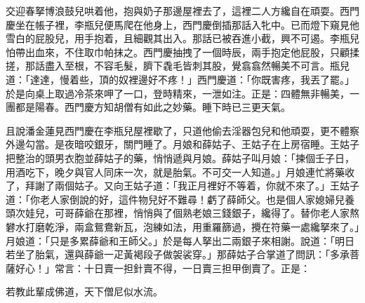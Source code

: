 交迎春拏博浪鼓兒哄着他，抱與奶子那邊屋裡去了，這裡二人方纔自在頑耍。西門慶坐在帳子裡，李瓶兒便馬爬在他身上，西門慶倒插那話入牝中。已而燈下窺見他雪白的屁股兒，用手抱着，且細觀其出入。那話已被吞進小截，興不可遏。李瓶兒怕帶出血來，{}不住取巾帕抹之。西門慶抽拽了一個時辰，兩手抱定他屁股，只顧揉搓，那話盡入至根，不容毛髮，臍下毳毛皆刺其股，覺翕翕然暢美不可言。瓶兒道：「達達，慢着些，頂的奴裡邊好不疼！」西門慶道：「你既害疼，我丟了罷。」於是向桌上取過冷茶來呷了一口，登時精來，一泄如注。正是：四體無非暢美，一團都是陽春。西門慶方知胡僧有如此之妙藥。睡下時已三更天氣。

且說潘金蓮見西門慶在李瓶兒屋裡歇了，只道他偷去淫器包兒和他頑耍，更不體察外邊勾當。是夜暗咬銀牙，關門睡了。月娘和薛姑子、王姑子在上房宿睡。王姑子把整治的頭男衣胞並薛姑子的藥，悄悄遞與月娘。薛姑子叫月娘：「揀個壬子日，用酒吃下，晚夕與官人同床一次，就是胎氣。不可交一人知道。」月娘連忙將藥收了，拜謝了兩個姑子。又向王姑子道：「我正月裡好不等着，你就不來了。」王姑子道：「你老人家倒說的好，這件物兒好不難尋！虧了薛師父。也是個人家媳婦兒養頭次娃兒，可哥薛爺在那裡，悄悄與了個熟老娘三錢銀子，纔得了。{}替你老人家熬礬水打磨乾淨，兩盒鴛鴦新瓦，泡練如法，用重羅篩過，攪在符藥一處纔拏來了。」月娘道：「只是多累薛爺和王師父。」於是每人拏出二兩銀子來相謝。說道：「明日若坐了胎氣，還與薛爺一疋黃褐段子做袈裟穿。」那薛姑子合掌道了問訊：「多承菩薩好心！」常言：十日賣一担針賣不得，一日賣三担甲倒賣了。正是：

\begin{myquote} 
若教此輩成佛道，天下僧尼似水流。
\end{myquote} 

